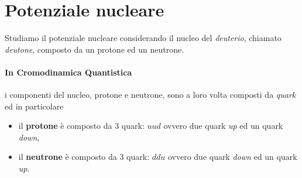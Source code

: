 
\section{Potenziale nucleare}
Studiamo il potenziale nucleare considerando il nucleo del \emph{deuterio}, chiamato \emph{deutone}, composto da un protone ed un neutrone.

\paragraph{In Cromodinamica Quantistica}
i componenti del nucleo, protone e neutrone, sono a loro volta composti da \emph{quark} ed in particolare
\begin{itemize}
\item il \textbf{protone} è composto da 3 quark:  $uud$ ovvero due quark \emph{up} ed un quark \emph{down},
\item il \textbf{neutrone} è composto da 3 quark:  $ddu$ ovvero due quark \emph{down} ed un quark \emph{up}.
\end{itemize}
